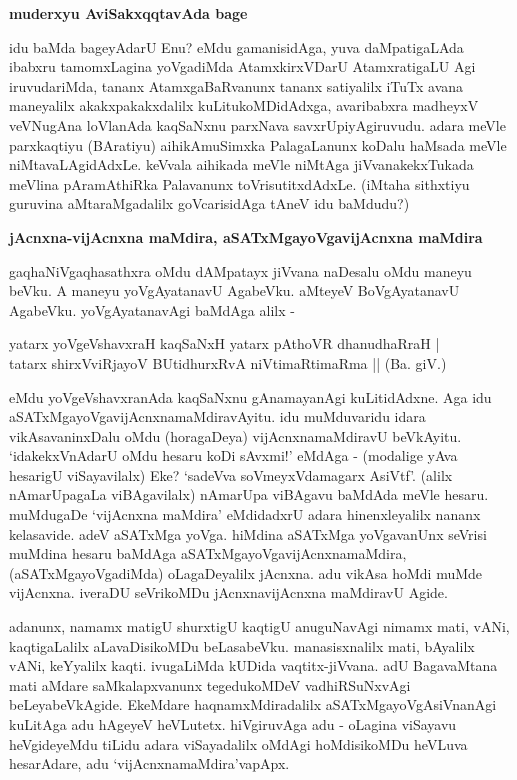 {\bigskip
\noindent
{\large\bf muderxyu AviSakxqqtavAda bage}}\label{page73}
\medskip

\noindent
idu baMda bageyAdarU Enu? eMdu gamanisidAga, yuva daMpatigaLAda ibabxru tamomxLagina yoVgadiMda AtamxkirxVDarU AtamxratigaLU Agi iruvudariMda, tananx AtamxgaBaRvanunx tananx satiyalilx iTuTx avana maneyalilx akakxpakakxdalilx kuLitukoMDidAdxga, avaribabxra madheyxV veVNugAna loVlanAda kaqSaNxnu parxNava savxrUpiyAgiruvudu. adara meVle parxkaqtiyu (BAratiyu) aihikAmuSimxka PalagaLanunx koDalu haMsada meVle niMtavaLAgidAdxLe. keVvala aihikada meVle niMtAga jiVvanakekxTukada meVlina pAramAthiRka Palavanunx toVrisutitxdAdxLe. (iMtaha sithxtiyu guruvina aMtaraMgadalilx goVcarisidAga tAneV idu baMdudu?)

{\bigskip
\noindent
{\large\bf jAcnxna-vijAcnxna maMdira, aSATxMgayoVgavijAcnxna maMdira}}\label{page73a}
\medskip

\noindent
gaqhaNiVgaqhasathxra oMdu dAMpatayx jiVvana naDesalu oMdu maneyu beVku. A maneyu yoVgAyatanavU AgabeVku. aMteyeV BoVgAyatanavU AgabeVku. yoVgAyatanavAgi baMdAga alilx -

\smallskip
\begin{shloka}
yatarx yoVgeVshavxraH kaqSaNxH yatarx pAthoVR dhanudhaRraH |\\\label{73a}
tatarx shirxVviRjayoV BUtidhurxRvA niVtimaRtimaRma || \hfill{(Ba. giV.)}
\end{shloka}
\smallskip

eMdu yoVgeVshavxranAda kaqSaNxnu gAnamayanAgi kuLitidAdxne. Aga idu aSATxMgayoVgavijAcnxnamaMdiravAyitu. idu muMduvaridu idara vikAsavaninxDalu oMdu (horagaDeya) vijAcnxnamaMdiravU beVkAyitu. `idakekxVnAdarU oMdu hesaru koDi sAvxmi!' eMdAga - (modalige yAva hesarigU viSayavilalx) Eke? `sadeVva soVmeyxVdamagarx AsiVtf'\label{74}. (alilx nAmarUpagaLa viBAgavilalx) nAmarUpa viBAgavu baMdAda meVle hesaru. muMdugaDe `vijAcnxna maMdira' eMdidadxrU adara hinenxleyalilx nananx kelasavide. adeV aSATxMga yoVga. hiMdina aSATxMga yoVgavanUnx seVrisi muMdina hesaru baMdAga aSATxMgayoVgavijAcnxnamaMdira, (aSATxMgayoVgadiMda) oLagaDeyalilx jAcnxna. adu vikAsa hoMdi muMde vijAcnxna. iveraDU seVrikoMDu jAcnxnavijAcnxna maMdiravU Agide.

adanunx, namamx matigU shurxtigU kaqtigU anuguNavAgi nimamx mati, vANi, kaqtigaLalilx aLavaDisikoMDu beLasabeVku. manasisxnalilx mati, bAyalilx vANi, keYyalilx kaqti. ivugaLiMda kUDida vaqtitx-jiVvana. adU BagavaMtana mati aMdare saMkalapxvanunx tegedukoMDeV vadhiRSuNxvAgi beLeyabeVkAgide. EkeMdare haqnamxMdiradalilx aSATxMgayoVgAsiVnanAgi kuLitAga adu hAgeyeV heVLutetx. hiVgiruvAga adu - oLagina viSayavu heVgideyeMdu tiLidu adara viSayadalilx oMdAgi hoMdisikoMDu heVLuva hesarAdare, adu `vijAcnxnamaMdira'vapApx.

